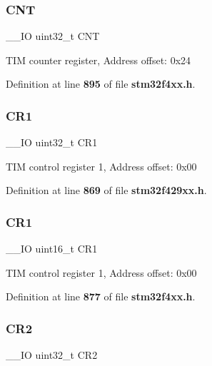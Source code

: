 \mbox{\label{structTIM__TypeDef_a6095a27d764d06750fc0d642e08f8b2a}} 
\subsubsection{C\+NT}
{\footnotesize\ttfamily \+\_\+\+\_\+\+IO uint32\+\_\+t C\+NT}

T\+IM counter register, Address offset\+: 0x24 

Definition at line \textbf{ 895} of file \textbf{ stm32f4xx.\+h}.

\mbox{\label{structTIM__TypeDef_ab0ec7102960640751d44e92ddac994f0}} 
\subsubsection{C\+R1\hspace{0.1cm}{\footnotesize\ttfamily [1/2]}}
{\footnotesize\ttfamily \+\_\+\+\_\+\+IO uint32\+\_\+t C\+R1}

T\+IM control register 1, Address offset\+: 0x00 

Definition at line \textbf{ 869} of file \textbf{ stm32f429xx.\+h}.

\mbox{\label{structTIM__TypeDef_a61400ce239355b62aa25c95fcc18a5e1}} 
\subsubsection{C\+R1\hspace{0.1cm}{\footnotesize\ttfamily [2/2]}}
{\footnotesize\ttfamily \+\_\+\+\_\+\+IO uint16\+\_\+t C\+R1}

T\+IM control register 1, Address offset\+: 0x00 

Definition at line \textbf{ 877} of file \textbf{ stm32f4xx.\+h}.

\mbox{\label{structTIM__TypeDef_afdfa307571967afb1d97943e982b6586}} 
\subsubsection{C\+R2\hspace{0.1cm}{\footnotesize\ttfamily [1/2]}}
{\footnotesize\ttfamily \+\_\+\+\_\+\+IO uint32\+\_\+t C\+R2}

